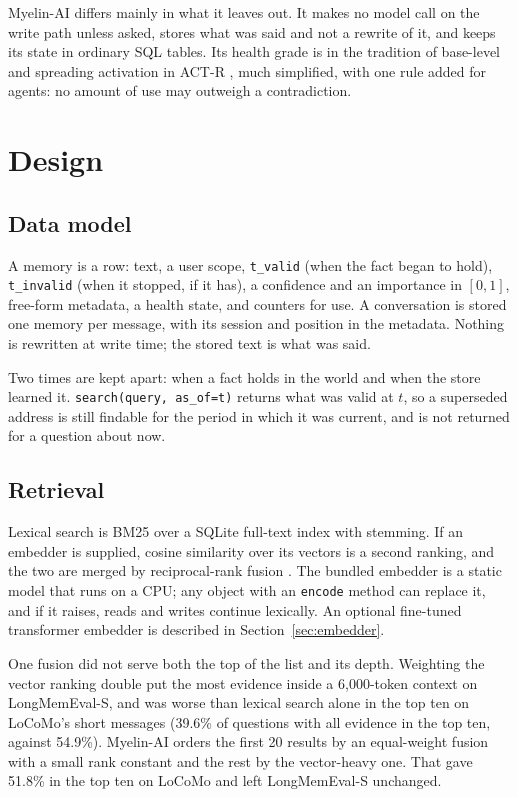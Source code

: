 \documentclass[11pt]{article}
\begin{document}
\mbox{Myelin-AI} differs mainly in what it leaves out. It makes no model call on
the write path unless asked, stores what was said and not a rewrite of
it, and keeps its state in ordinary SQL tables. Its health grade is in
the tradition of base-level and spreading activation in ACT-R
\citep{anderson2004actr}, much simplified, with one rule added for
agents: no amount of use may outweigh a contradiction.

\section{Design}

\subsection{Data model}

A memory is a row: text, a user scope, \texttt{t\_valid} (when the
fact began to hold), \texttt{t\_invalid} (when it stopped, if it has),
a confidence and an importance in $[0,1]$, free-form metadata, a
health state, and counters for use. A conversation is stored one
memory per message, with its session and position in the metadata.
Nothing is rewritten at write time; the stored text is what was said.

Two times are kept apart: when a fact holds in the world and when the
store learned it. \texttt{search(query, as\_of=t)} returns what was
valid at $t$, so a superseded address is still findable for the period
in which it was current, and is not returned for a question about now.

\subsection{Retrieval}

Lexical search is BM25 \citep{robertson2009bm25} over a SQLite
full-text index with stemming. If an embedder is supplied, cosine
similarity over its vectors is a second ranking, and the two are merged
by reciprocal-rank fusion \citep{cormack2009rrf}. The bundled embedder
is a static model that runs on a CPU; any object with an
\texttt{encode} method can replace it, and if it raises, reads and
writes continue lexically. An optional fine-tuned transformer embedder
is described in Section~\ref{sec:embedder}.

One fusion did not serve both the top of the list and its depth.
Weighting the vector ranking double put the most evidence inside a
6{,}000-token context on LongMemEval-S, and was worse than lexical
search alone in the top ten on LoCoMo's short messages (39.6\% of
questions with all evidence in the top ten, against 54.9\%). \mbox{Myelin-AI}
orders the first 20 results by an equal-weight fusion with a small
rank constant and the rest by the vector-heavy one. That gave 51.8\%
in the top ten on LoCoMo and left LongMemEval-S unchanged.
\end{document}
